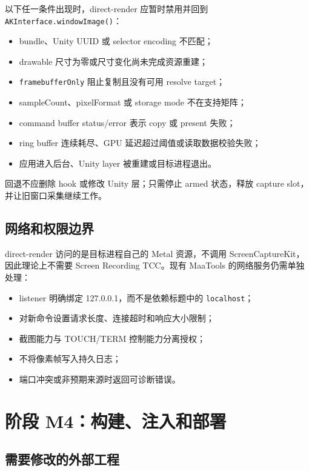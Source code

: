 \documentclass[UTF8,a4paper,11pt]{ctexart}
\begin{document}
以下任一条件出现时，direct-render 应暂时禁用并回到 \texttt{AKInterface.windowImage()}：

\begin{itemize}
  \item bundle、Unity UUID 或 selector encoding 不匹配；
  \item drawable 尺寸为零或尺寸变化尚未完成资源重建；
  \item \texttt{framebufferOnly} 阻止复制且没有可用 resolve target；
  \item sampleCount、pixelFormat 或 storage mode 不在支持矩阵；
  \item command buffer status/error 表示 copy 或 present 失败；
  \item ring buffer 连续耗尽、GPU 延迟超过阈值或读取数据校验失败；
  \item 应用进入后台、Unity layer 被重建或目标进程退出。
\end{itemize}

回退不应删除 hook 或修改 Unity 层；只需停止 armed 状态，释放 capture slot，并让旧窗口采集继续工作。

\subsection{网络和权限边界}

direct-render 访问的是目标进程自己的 Metal 资源，不调用 ScreenCaptureKit，因此理论上不需要 Screen Recording TCC。现有 MaaTools 的网络服务仍需单独处理：

\begin{itemize}
  \item listener 明确绑定 127.0.0.1，而不是依赖标题中的 \texttt{localhost}；
  \item 对新命令设置请求长度、连接超时和响应大小限制；
  \item 截图能力与 TOUCH/TERM 控制能力分离授权；
  \item 不将像素帧写入持久日志；
  \item 端口冲突或非预期来源时返回可诊断错误。
\end{itemize}

\section{阶段 M4：构建、注入和部署}

\subsection{需要修改的外部工程}
\end{document}

